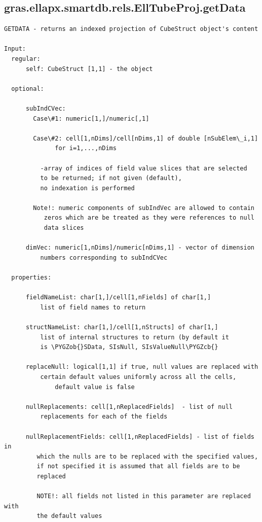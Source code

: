 \documentclass[letterpaper,10pt,english]{sphinxmanual}
\def\PYGZob{\char`\{}
\def\PYGZcb{\char`\}}
\begin{document}
\subsection{gras.ellapx.smartdb.rels.EllTubeProj.getData}
\label{chap_functions:gras-ellapx-smartdb-rels-elltubeproj-getdata}
\begin{Verbatim}[commandchars=\\\{\}]
GETDATA - returns an indexed projection of CubeStruct object's content

Input:
  regular:
      self: CubeStruct [1,1] - the object

  optional:

      subIndCVec:
        Case\#1: numeric[1,]/numeric[,1]

        Case\#2: cell[1,nDims]/cell[nDims,1] of double [nSubElem\_i,1]
              for i=1,...,nDims

          -array of indices of field value slices that are selected
          to be returned; if not given (default),
          no indexation is performed

        Note!: numeric components of subIndVec are allowed to contain
           zeros which are be treated as they were references to null
           data slices

      dimVec: numeric[1,nDims]/numeric[nDims,1] - vector of dimension
          numbers corresponding to subIndCVec

  properties:

      fieldNameList: char[1,]/cell[1,nFields] of char[1,]
          list of field names to return

      structNameList: char[1,]/cell[1,nStructs] of char[1,]
          list of internal structures to return (by default it
          is \PYGZob{}SData, SIsNull, SIsValueNull\PYGZcb{}

      replaceNull: logical[1,1] if true, null values are replaced with
          certain default values uniformly across all the cells,
              default value is false

      nullReplacements: cell[1,nReplacedFields]  - list of null
          replacements for each of the fields

      nullReplacementFields: cell[1,nReplacedFields] - list of fields in
         which the nulls are to be replaced with the specified values,
         if not specified it is assumed that all fields are to be
         replaced

         NOTE!: all fields not listed in this parameter are replaced with
         the default values


\end{Verbatim}
\end{document}
